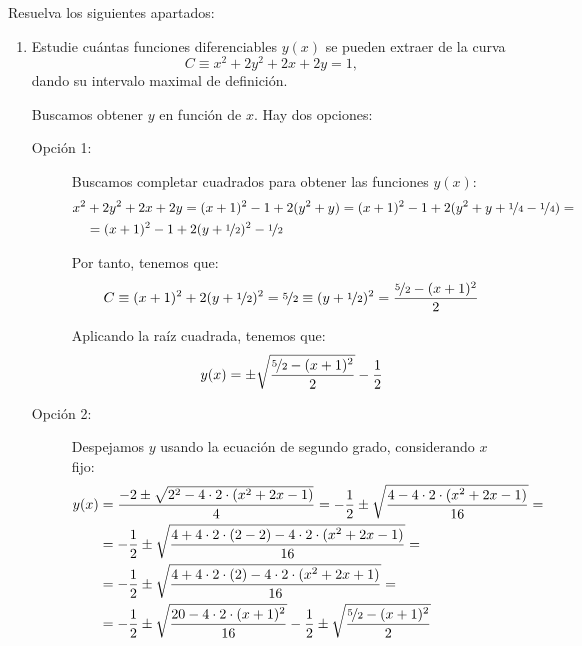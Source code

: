 \begin{ejercicio} Resuelva los siguientes apartados:
    \begin{enumerate}
        \item Estudie cuántas funciones diferenciables \(y(x)\) se pueden extraer de la curva
        \begin{equation*}
            C \equiv x^2 + 2y^2 + 2x + 2y = 1,
        \end{equation*}
        dando su intervalo maximal de definición.

        Buscamos obtener $y$ en función de $x$. Hay dos opciones:
        \begin{description}
            \item[Opción 1:] Buscamos completar cuadrados para obtener las funciones $y(x)$:
            \begin{align*}
                x^2 &+ 2y^2 + 2x + 2y = (x+1)^2 -1 + 2(y^2+y)
                = (x+1)^2 -1+ 2(y^2+y+\nicefrac{1}{4} - \nicefrac{1}{4})
                =\\&= (x+1)^2 -1+ 2(y+\nicefrac{1}{2})^2 - \nicefrac{1}{2}
            \end{align*}
            
            Por tanto, tenemos que:
            \begin{equation*}
                C\equiv (x+1)^2 + 2(y+\nicefrac{1}{2})^2 = \nicefrac{5}{2}
                \equiv (y+\nicefrac{1}{2})^2 = \dfrac{\nicefrac{5}{2} - (x+1)^2}{2}
            \end{equation*}
    
            Aplicando la raíz cuadrada, tenemos que:
            \begin{equation*}
                y(x) = \pm \sqrt{\dfrac{\nicefrac{5}{2} - (x+1)^2}{2}} - \frac{1}{2}
            \end{equation*}

            \item[Opción 2:] Despejamos $y$ usando la ecuación de segundo grado, considerando $x$ fijo:
            \begin{align*}
                y(x)&= \dfrac{-2\pm \sqrt{2^2 - 4\cdot 2\cdot (x^2+2x-1)}}{4}
                = -\frac{1}{2} \pm \sqrt{\dfrac{4 - 4\cdot 2\cdot (x^2+2x-1)}{16}}
                =\\&= -\frac{1}{2} \pm \sqrt{\dfrac{4 +4\cdot 2\cdot (2-2)- 4\cdot 2\cdot (x^2+2x-1)}{16}}
                =\\&= -\frac{1}{2} \pm \sqrt{\dfrac{4 +4\cdot 2\cdot (2)- 4\cdot 2\cdot (x^2+2x+1)}{16}}
                =\\&= -\frac{1}{2} \pm \sqrt{\dfrac{20- 4\cdot 2\cdot (x+1)^2}{16}}
                -\frac{1}{2} \pm \sqrt{\dfrac{\nicefrac{5}{2}- (x+1)^2}{2}}
            \end{align*}
        \end{description}


\end{enumerate}
\end{ejercicio}
